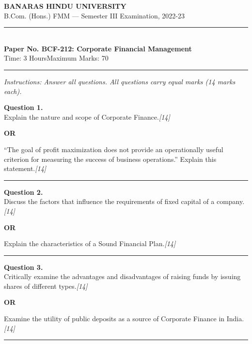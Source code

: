 \documentclass[11pt,a4paper]{article}
\newcommand{\pts}[1]{\hfill   \textit{[#1]}}
\begin{document}
\begin{center}
  {\large\bfseries BANARAS HINDU UNIVERSITY}\\[2pt]
  {\normalsize B.Com. (Hons.) FMM --- Semester III Examination, 2022-23}\\[6pt]
  \rule{0.8\linewidth}{0.5pt}\\[6pt]
  {\large\bfseries Paper No. BCF-212: Corporate Financial Management}\\[4pt]
  {\normalsize Time: 3 Hours\hfill Maximum Marks: 70}
\end{center}

\rule{\linewidth}{0.4pt}

\smallskip



\noindent   \textit{Instructions: Answer all questions. All questions carry equal marks (14 marks each).}

\bigskip




\noindent   \textbf{Question 1.} \\
Explain the nature and scope of Corporate Finance.\pts{14}

\centerline{   \textbf{OR}}

``The goal of profit maximization does not provide an operationally useful criterion for measuring the success of business operations.'' Explain this statement.\pts{14}

\medskip\rule{\linewidth}{0.2pt}




\noindent   \textbf{Question 2.} \\
Discuss the factors that influence the requirements of fixed capital of a company.\pts{14}

\centerline{   \textbf{OR}}

Explain the characteristics of a Sound Financial Plan.\pts{14}

\medskip\rule{\linewidth}{0.2pt}




\noindent   \textbf{Question 3.} \\
Critically examine the advantages and disadvantages of raising funds by issuing shares of different types.\pts{14}

\centerline{   \textbf{OR}}

Examine the utility of public deposits as a source of Corporate Finance in India.\pts{14}

\medskip\rule{\linewidth}{0.2pt}
\end{document}
